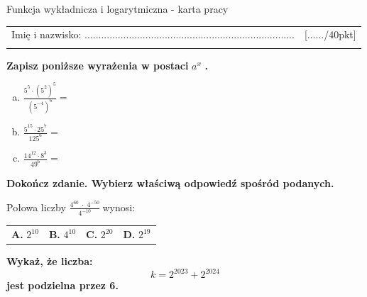 \documentclass[12pt,a4paper]{article}
\theoremstyle{break}
\begin{document}
	
	\begin{center}
		\LARGE Funkcja wykładnicza i logarytmiczna - karta pracy
	\end{center}
	
	\begin{tabular}{p{13cm} r}
		Imię i nazwisko: ............................................................................
		&[....../40pkt]\\ 
		\vspace{0.5cm}
	\end{tabular}
	
	\begin{zad}[0-3]
		\textbf{Zapisz poniższe wyrażenia w postaci} $a^x$ \textbf{.}
	\end{zad} 
	
	\begin{enumerate}[a)]\Large
		\item $\frac{5^5\cdot(5^2)^5}{(5^{-4})^6}=$
		\item $\frac{5^{15}\cdot25^7}{125^6}=$
		\item $\frac{14^{12}\cdot8^3}{49^6}=$
	\end{enumerate}
	
	
	\begin{zad}[0-1]
		\textbf{Dokończ zdanie. Wybierz właściwą odpowiedź spośród podanych.}
	\end{zad} 
	
	Połowa liczby \Large$\frac{4^{60}\;\cdot\;4^{-50}}{4^{-10}}\:$\normalsize wynosi:
	
	\vspace{0.5cm}
	\begin{tabular}{p{3.5cm} p{3.5cm} p{3.5cm} p{3.5cm}}
		\textbf{A. }$2^{10}$&
		\textbf{B. }$4^{10}$&
		\textbf{C. }$2^{20}$&
		\textbf{D. }$2^{19}$\\
	\end{tabular}
	
	
	\begin{zad}[0-3]
		\textbf{Wykaż, że liczba:}
		$$k=2^{2023}+2^{2024}$$
		\textbf{jest podzielna przez 6.}
	\end{zad} 
	
\end{document}
